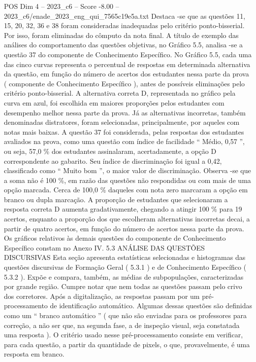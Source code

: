 \begin{textsample}{POS Dim 4 – 2023\_c6 – Score -8.00 – 2023\_c6/enade\_2023\_eng\_qui\_7565c19e5a.txt}
Destaca -se que as questões 11, 15, 20, 32, 36 e 38 foram consideradas inadequadas pelo critério ponto-bisserial.
Por isso, foram eliminadas do cômputo da nota final.
A título de exemplo das análises do comportamento das questões objetivas, no Gráfico 5.5, analisa -se a questão 37 do componente de Conhecimento Específico.
No Gráfico 5.5, cada uma das cinco curvas representa o percentual de respostas em determinada alternativa da questão, em função do número de acertos dos estudantes nessa parte da prova ( componente de Conhecimento Específico ), antes de possíveis eliminações pelo critério ponto-bisserial.
A alternativa correta D, representada no gráfico pela curva em azul, foi escolhida em maiores proporções pelos estudantes com desempenho melhor nessa parte da prova.
Já as alternativas incorretas, também denominadas distratores, foram selecionadas, principalmente, por aqueles com notas mais baixas.
A questão 37 foi considerada, pelas respostas dos estudantes avaliados na prova, como uma questão com índice de facilidade “ Médio, 0,57 ”, ou seja, 57,0 \% dos estudantes assinalaram, acertadamente, a opção D correspondente ao gabarito.
Seu índice de discriminação foi igual a 0,42, classificado como “ Muito bom ”, o maior valor de discriminação.
Observa -se que a soma não é 100 \%, em razão das questões não respondidas ou com mais de uma opção marcada.
Cerca de 100,0 \% daqueles com nota zero marcaram a opção em branco ou dupla marcação.
A proporção de estudantes que selecionaram a resposta correta D aumenta gradativamente, chegando a atingir 100 \% para 19 acertos, enquanto a proporção dos que escolheram alternativas incorretas decai, a partir de quatro acertos, em função do número de acertos nessa parte da prova.
Os gráficos relativos às demais questões do componente de Conhecimento Específico constam no Anexo IV. 5.3 ANÁLISE DAS QUESTÕES DISCURSIVAS Esta seção apresenta estatísticas selecionadas e histogramas das questões discursivas de Formação Geral ( 5.3.1 ) e de Conhecimento Específico ( 5.3.2 ).
Expõe e compara, também, as médias de subpopulações, caracterizadas por grande região.
Cumpre notar que nem todas as questões passam pelo crivo dos corretores.
Após a digitalização, as respostas passam por um pré-processamento de identificação automático.
Algumas dessas questões são definidas como um “ branco automático ” ( que não são enviadas para os professores para correção, a não ser que, na segunda fase, a de inspeção visual, seja constatada uma resposta ).
O critério usado nesse pré-processamento consiste em verificar, para cada questão, a partir da quantidade de pixels, o que, provavelmente, é uma resposta em branco.

\end{textsample}
